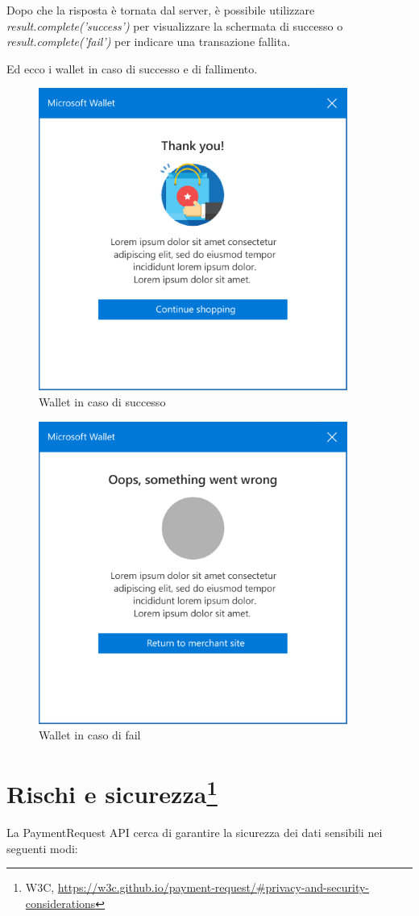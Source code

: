 \documentclass[11pt ,a4paper , twoside , openright ]{book}
\begin{document}
	Dopo che la risposta è tornata dal server, è possibile utilizzare \textit{result.complete('success')} per visualizzare la schermata di successo o \textit{result.complete('fail')} per indicare una transazione fallita.
	
	\pagebreak
	Ed ecco i wallet in caso di successo e di fallimento.
	\begin{figure}[h]
		\centering
		\includegraphics[width=0.5\linewidth]{wallet2}
		\caption{Wallet in caso di successo}
		\label{fig: Wallet in caso di successo}
	\end{figure}
	\begin{figure}[h]
		\centering
		\includegraphics[width=0.5\linewidth]{wallet3}
		\caption{Wallet in caso di fail}
		\label{fig: Wallet in caso di fail}
	\end{figure}
	
	
	\section[Rischi e sicurezza]{Rischi e sicurezza\footnote{W3C, \url{https://w3c.github.io/payment-request/\#privacy-and-security-considerations}}} 
	La PaymentRequest API cerca di garantire la sicurezza dei dati sensibili nei seguenti modi:
	
\end{document}

